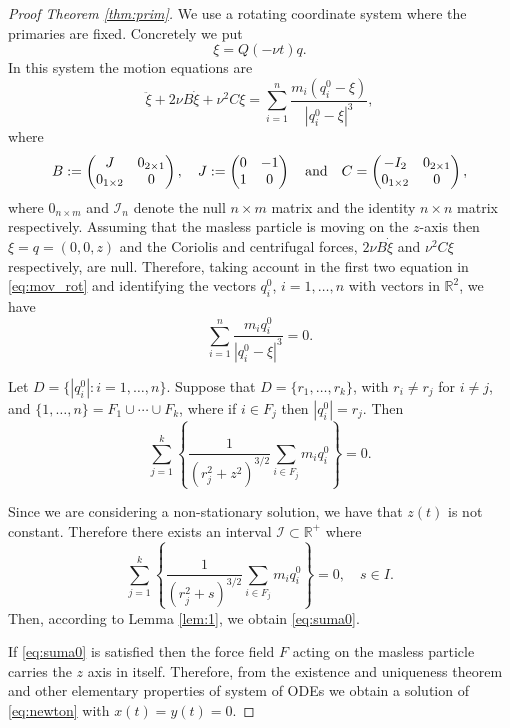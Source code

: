 \documentclass[twoside]{article}
\theoremstyle{remark}
\newcommand{\rr}{\mathbb{R}}
\begin{document}
\begin{proof} [Proof Theorem \ref{thm:prim}] We use a rotating coordinate system where the primaries are fixed. Concretely we  put
\[\xi=Q(-\nu t)q.\]
In this system the motion equations are
\begin{equation}\label{eq:mov_rot}\ddot{\xi}+2\nu B\dot{\xi}+\nu^2 C\xi=\sum_{i=1}^n\frac{m_i(q_i^0-\xi)}{|q_i^0-\xi|^3},\end{equation}
where
\[B:=\begin{pmatrix}
       J & 0_{2\times 1}\\
       0_{1\times 2} & 0\\
     \end{pmatrix},\quad J:=\begin{pmatrix}
       0 & -1\\
       1 & 0\\
     \end{pmatrix}\quad\hbox{and}\quad C=\begin{pmatrix}
       -I_{2} & 0_{2\times 1}\\
       0_{1\times 2} & 0\\
     \end{pmatrix},
\]
where $0_{n\times m}$ and $\mathcal{I}_{n}$ denote the null $n\times m$ matrix  and the identity $n\times n$ matrix respectively. Assuming that the masless particle is moving on the $z$-axis then $\xi=q=(0,0,z)$ and the Coriolis and centrifugal forces,   $2\nu B\dot{\xi}$ and $\nu^2 C\xi$ respectively, are null. Therefore, taking account in the first two equation in \eqref{eq:mov_rot} and identifying the vectors $q_i^0$, $i=1,\ldots,n$ with vectors in $\rr^2$, we have
\[
\sum_{i=1}^n\frac{m_iq_i^0}{|q_i^0-\xi|^3}=0.
\]

Let $D=\{|q_i^0|: i=1,\ldots,n\}$.  Suppose that $D=\{r_1,\ldots,r_k\}$, with $r_i\neq r_j$ for $i\neq j$, and  $\{1,\ldots,n\}=F_1\cup \cdots\cup F_k$, where if $i\in F_j$ then $|q_i^0|=r_j$. Then
\[\sum_{j=1}^k\left\{\frac{1}{(r_j^{2}+z^2)^{3/2}}\sum_{i\in F_j}m_iq_i^0\right\}=0.\]

Since we are considering a non-stationary solution, we have that $z(t)$ is not constant. Therefore there exists an interval $\mathcal{I}\subset\rr^+$ where
\[\sum_{j=1}^k\left\{\frac{1}{(r_j^{2}+s)^{3/2}}\sum_{i\in F_j}m_iq_i^0\right\}=0,\quad s\in I.\]
Then, according to Lemma \ref{lem:1}, we obtain \eqref{eq:suma0}.

If  \eqref{eq:suma0} is satisfied then the force field $F$ acting on the masless
particle carries the $z$ axis in itself. Therefore, from the existence and uniqueness theorem and other elementary properties of system of ODEs we obtain a solution  of \eqref{eq:newton} with $x(t)=y(t)=0$.  \end{proof}
\end{document}
